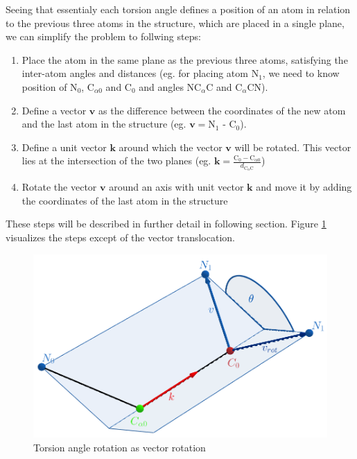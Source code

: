 Seeing that essentialy each torsion angle defines a position of an atom in relation to the previous three atoms in the structure, which are placed in a single plane, we can simplify the problem to follwing steps:

\begin{enumerate}
    \item Place the atom in the same plane as the previous three atoms, satisfying the inter-atom angles and distances (eg. for placing atom N$_1$, we need to know position of N$_0$, C$_{\alpha 0}$ and C$_0$ and angles NC$_\alpha$C and C$_\alpha$CN).
    
    \item Define a vector $\bm{v}$ as the difference between the coordinates of the new atom and the last atom in the structure (eg. $\bm{v} = $N$_1$ - C$_0$).
    
    \item Define a unit vector $\bm{k}$ around which the vector $\bm{v}$ will be rotated. This vector lies at the intersection of the two planes (eg. $\bm{k} = \frac{\textrm{C}_0 - \textrm{C}_{\alpha 0}}{d_{\textrm{C}_{\alpha} \textrm{C}}}$)
    
    \item Rotate the vector $\bm{v}$ around an axis with unit vector $\bm{k}$ and move it by adding the coordinates of the last atom in the structure
\end{enumerate}

These steps will be described in further detail in following section. Figure \ref{fig:bond_rotation} visualizes the steps except of the vector translocation.

\begin{figure}
    \centering
    \includegraphics[scale=0.28]{imgs_tomas/rodrigues_backbone.png}
    \caption{Torsion angle rotation as vector rotation}
    \label{fig:bond_rotation}
\end{figure}

